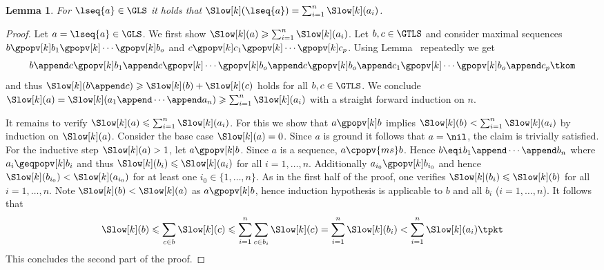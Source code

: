 \documentclass{LMCS}
\newtheorem{lemma}[thm]{Lemma}
\begin{document}
\begin{lemma}\label{l:slowsum} 
  For $\lseq{a} \in \GLS$ it holds that $\Slow[k](\lseq{a}) = \sum_{i=1}^n \Slow[k](a_i)$.
\end{lemma}
\begin{proof}
  Let $a = \lseq{a} \in \GLS$.
  We first show $\Slow[k](a) \geqslant \sum_{i=1}^n \Slow[k](a_i)$.
  Let $b,c \in \GTLS$ and consider maximal sequences
  $b \gpopv[k] b_1 \gpopv[k] \cdots \gpopv[k] b_o$ and
  $c \gpopv[k] c_1 \gpopv[k] \cdots \gpopv[k] c_p$.
  Using Lemma~ repeatedly we get
  $$
  b \append c \gpopv[k] b_1 \append c \gpopv[k] \cdots \gpopv[k] b_o \append c
  \gpopv[k] b_o \append c_1 \gpopv[k]  \cdots \gpopv[k] b_o \append c_p \tkom
  $$
and thus 
  $\Slow[k](b \append c) \geqslant \Slow[k](b) + \Slow[k](c)$ holds
  for all $b,c \in \GTLS$. We conclude
  $
  \Slow[k](a) =  \Slow[k](a_1 \append \cdots \append a_n) \geqslant \sum_{i=1}^n \Slow[k](a_i)
  $ 
  with a straight forward induction on $n$.

  It remains to verify $\Slow[k](a) \leqslant \sum_{i=1}^n \Slow[k](a_i)$.
  For this we show that $a \gpopv[k] b$ implies $\Slow[k](b) < \sum_{i=1}^n \Slow[k](a_i)$
  by induction on $\Slow[k](a)$.
  Consider the base case $\Slow[k](a) = 0$.
  Since $a$ is ground it follows that $a = \nil$, the claim is trivially satisfied.
  For the inductive step $\Slow[k](a) > 1$, 
  let $a \gpopv[k] b$.
  Since $a$ is a sequence, $a \cpopv{ms} b$.
  Hence $b \eqi b_1 \append \cdots \append b_n$ where $a_i \geqpopv[k] b_i$ 
  and thus $\Slow[k](b_i) \leqslant \Slow[k](a_i)$ for all $i =1,\dots,n$.
  Additionally $a_{i_0} \gpopv[k] b_{i_0}$ and hence $\Slow[k](b_{i_0}) < \Slow[k](a_{i_0})$ 
  for at least one $i_0 \in \{1,\dots,n\}$.
As in the first half of the proof, one verifies $\Slow[k](b_i) \leqslant \Slow[k](b)$
  for all $i = 1,\dots,n$.
  Note $\Slow[k](b) < \Slow[k](a)$ as $a \gpopv[k] b$, 
  hence induction hypothesis is applicable to $b$ and all $b_i$ ($i = 1,\dots,n$).
  It follows that 
  \begin{align*}
    \Slow[k](b) \leqslant \sum_{c \in b} \Slow[k](c) 
    \leqslant \sum_{i=1}^n \sum_{c \in b_i} \Slow[k](c)
    = \sum_{i=1}^n \Slow[k](b_i) 
    < \sum_{i=1}^n \Slow[k](a_i) \tpkt
  \end{align*}
  This concludes the second part of the proof.
\end{proof}
\end{document}
